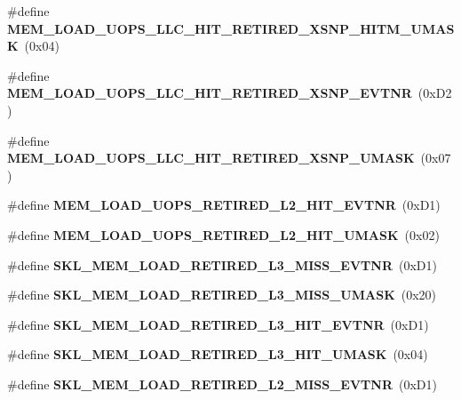 \begin{DoxyCompactItemize}
\item 
\mbox{\label{types_8h_aa57e7eeacd4455a45e3f3855d7dda1b7}} 
\#define {\bfseries M\+E\+M\+\_\+\+L\+O\+A\+D\+\_\+\+U\+O\+P\+S\+\_\+\+L\+L\+C\+\_\+\+H\+I\+T\+\_\+\+R\+E\+T\+I\+R\+E\+D\+\_\+\+X\+S\+N\+P\+\_\+\+H\+I\+T\+M\+\_\+\+U\+M\+A\+SK}~(0x04)
\item 
\mbox{\label{types_8h_a9ab609523dfe9b17befadca150ac310f}} 
\#define {\bfseries M\+E\+M\+\_\+\+L\+O\+A\+D\+\_\+\+U\+O\+P\+S\+\_\+\+L\+L\+C\+\_\+\+H\+I\+T\+\_\+\+R\+E\+T\+I\+R\+E\+D\+\_\+\+X\+S\+N\+P\+\_\+\+E\+V\+T\+NR}~(0x\+D2)
\item 
\mbox{\label{types_8h_aea0a7bb3fb1eea7c1a7d5f396c8a02d6}} 
\#define {\bfseries M\+E\+M\+\_\+\+L\+O\+A\+D\+\_\+\+U\+O\+P\+S\+\_\+\+L\+L\+C\+\_\+\+H\+I\+T\+\_\+\+R\+E\+T\+I\+R\+E\+D\+\_\+\+X\+S\+N\+P\+\_\+\+U\+M\+A\+SK}~(0x07)
\item 
\mbox{\label{types_8h_afae78f9334d9a6158f1523eabbb25d3a}} 
\#define {\bfseries M\+E\+M\+\_\+\+L\+O\+A\+D\+\_\+\+U\+O\+P\+S\+\_\+\+R\+E\+T\+I\+R\+E\+D\+\_\+\+L2\+\_\+\+H\+I\+T\+\_\+\+E\+V\+T\+NR}~(0x\+D1)
\item 
\mbox{\label{types_8h_a4090d60fa90984dc2932583c2a7ca545}} 
\#define {\bfseries M\+E\+M\+\_\+\+L\+O\+A\+D\+\_\+\+U\+O\+P\+S\+\_\+\+R\+E\+T\+I\+R\+E\+D\+\_\+\+L2\+\_\+\+H\+I\+T\+\_\+\+U\+M\+A\+SK}~(0x02)
\item 
\mbox{\label{types_8h_a70f3a89ce397e08fc2de484925efc611}} 
\#define {\bfseries S\+K\+L\+\_\+\+M\+E\+M\+\_\+\+L\+O\+A\+D\+\_\+\+R\+E\+T\+I\+R\+E\+D\+\_\+\+L3\+\_\+\+M\+I\+S\+S\+\_\+\+E\+V\+T\+NR}~(0x\+D1)
\item 
\mbox{\label{types_8h_a8d7d2702f3f7bd6c54fdc3ce7688de99}} 
\#define {\bfseries S\+K\+L\+\_\+\+M\+E\+M\+\_\+\+L\+O\+A\+D\+\_\+\+R\+E\+T\+I\+R\+E\+D\+\_\+\+L3\+\_\+\+M\+I\+S\+S\+\_\+\+U\+M\+A\+SK}~(0x20)
\item 
\mbox{\label{types_8h_ae28cf0ed4efd93a3c8d688b91c776be7}} 
\#define {\bfseries S\+K\+L\+\_\+\+M\+E\+M\+\_\+\+L\+O\+A\+D\+\_\+\+R\+E\+T\+I\+R\+E\+D\+\_\+\+L3\+\_\+\+H\+I\+T\+\_\+\+E\+V\+T\+NR}~(0x\+D1)
\item 
\mbox{\label{types_8h_ab68abaf5e76ba2263d8edc91bd981641}} 
\#define {\bfseries S\+K\+L\+\_\+\+M\+E\+M\+\_\+\+L\+O\+A\+D\+\_\+\+R\+E\+T\+I\+R\+E\+D\+\_\+\+L3\+\_\+\+H\+I\+T\+\_\+\+U\+M\+A\+SK}~(0x04)
\item 
\mbox{\label{types_8h_a731f31563eab3830165bba40d8308a36}} 
\#define {\bfseries S\+K\+L\+\_\+\+M\+E\+M\+\_\+\+L\+O\+A\+D\+\_\+\+R\+E\+T\+I\+R\+E\+D\+\_\+\+L2\+\_\+\+M\+I\+S\+S\+\_\+\+E\+V\+T\+NR}~(0x\+D1)
\item 

\end{DoxyCompactItemize}
